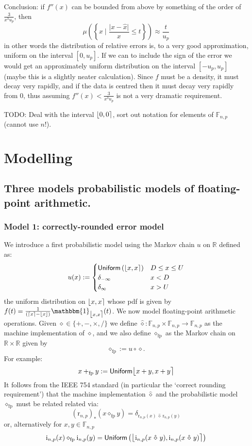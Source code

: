 \documentclass[10pt,a4paper]{article}
\theoremstyle{plain}
\theoremstyle{definition}
\newcommand{\F}[1][n,p]{\mathbb{F}_{#1}}
\newcommand{\R}{\mathbb{R}}
\newcommand{\Rep}[1][n,p]{\mathrm{i}_{#1}}
\newcommand{\Round}[1][n,p]{\mathrm{r}_{#1}}
\newcommand{\one}{\mathbbm{1}}
\newcommand{\Unif}{\mathsf{Uniform}}
\newcommand{\ceil}[1]{\lceil #1 \rceil}
\newcommand{\floor}[1]{\lfloor #1 \rfloor}
\newcommand{\fintvl}[1][x]{\mathlarger{\lfloor}#1,#1\mathlarger{\rceil}}
\newcommand{\fp}{_{\mathrm{fp}}}
\newcommand{\absv}[1]{\vert #1\vert}
\newcommand{\uro}[1][p]{u_{#1}}
\begin{document}
Conclusion: if $f''(x)$ can be bounded from above by something of the order of $\frac{3}{x^3\uro}$, then 
\[
\mu\left(\left\{x\mid  \frac{\absv{x-\hat{x}}}{x}\leq t\right\}\right)\approx \frac{t}{\uro}
\]
in other words the distribution of relative errors is, to a very good approximation, uniform on the interval $\left[0,\uro\right]$. If we can to include the sign of the error we would get an approximately uniform distribution on the interval $\left[-\uro,\uro\right]$ (maybe this is a slightly neater calculation). Since $f$ must be a density, it must decay very rapidly, and if the data is centred then it must decay very rapidly from 0, thus assuming $f''(x)<\frac{3}{x^3\uro}$ is not a very dramatic requirement.


TODO: Deal with the interval $\fintvl[0]$, sort out notation for elements of $\F$ (cannot use $n$!).
\section{Modelling}



\subsection{Three models probabilistic models of floating-point arithmetic.}

\subsubsection{Model 1: correctly-rounded error model}
We introduce a first probabilistic model using the Markov chain $u$ on $\R$ defined as:
\[
u(x):=\begin{cases}
\Unif\left(\fintvl\right)& D\leq x\leq U\\
\delta_{-\infty}& x< D\\
\delta_{\infty} & x>U\end{cases}
\]
the uniform distribution on $\fintvl$ whose pdf is given by $f(t)=\frac{1}{(\ceil{x}-\floor{x})}\one_{\fintvl}(t)$. We now model floating-point arithmetic operations. Given $\diamond\in \{+,-,\times,/\}$ we define $\widehat{\diamond}:\F\times \F\to \F$ as the machine implementation of $\diamond$, and we also define $\diamond\fp$ as the Markov chain on $\R\times \R$ given by
\[
\diamond\fp:=u\circ\diamond.
\]
For example:
\[
x+\fp y:=\Unif\fintvl[x+y]
\]
It follows from the IEEE 754 standard (in particular the `correct rounding requirement') that the machine implementation $\hat{\diamond}$ and the probabilistic model $\diamond\fp$ must be related related via:
\[
(\Round)_\ast(x\diamond\fp y)=\delta_{\Round(x)~\widehat{\diamond}~\Round(y)}
\]
or, alternatively for $x,y\in\F$
\[
\Rep(x)\diamond\fp \Rep(y)=\Unif\left(\fintvl[\Rep(x~\hat{\diamond}~y)]\right)
\]
\end{document}

